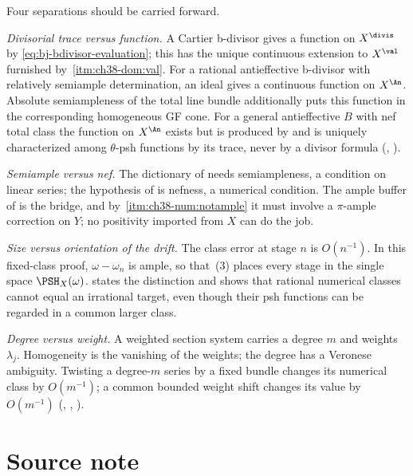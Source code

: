 Four separations should be carried forward.

\emph{Divisorial trace versus function.}  A Cartier b-divisor gives a
function on $X^{\divis}$ by \eqref{eq:bj-bdivisor-evaluation}; this has the
unique continuous extension to $X^{\val}$ furnished by
\,\cref{itm:ch38-dom:val}.  For a rational antieffective b-divisor with relatively semiample
determination, an ideal gives a continuous function on $X^{\An}$.
Absolute semiampleness of the total line bundle additionally puts
this function in the corresponding homogeneous GF cone.  For a general antieffective $B$ with nef total
class the function on $X^{\An}$ exists but is produced by
 and is uniquely characterized
among $\theta$-psh functions by its trace, never by a divisor formula
(,
).

\emph{Semiample versus nef.}  The dictionary of
 needs semiampleness, a condition on
linear series; the hypothesis of
 is nefness, a numerical condition.
The ample buffer of  is the bridge, and by
\,\cref{itm:ch38-num:notample} it must
involve a $\pi$-ample correction on $Y$; no positivity imported from
$X$ can do the job.

\emph{Size versus orientation of the drift.}  The class error at stage
$n$ is $O(n^{-1})$. In this fixed-class proof,
$\omega-\omega_n$ is ample, so that
\,(3) places every stage in the single space
$\PSH_X(\omega)$.   states the
distinction and  shows that rational numerical classes cannot equal an
irrational target, even though their psh functions can be regarded
in a common larger class.

\emph{Degree versus weight.}  A weighted section system carries a degree
$m$ and weights $\lambda_j$.  Homogeneity is the vanishing of the
weights; the degree has a Veronese ambiguity. Twisting a degree-$m$
series by a fixed bundle changes its numerical class by $O(m^{-1})$;
a common bounded weight shift changes its value by $O(m^{-1})$
(, ,
).

\section{Source note}

